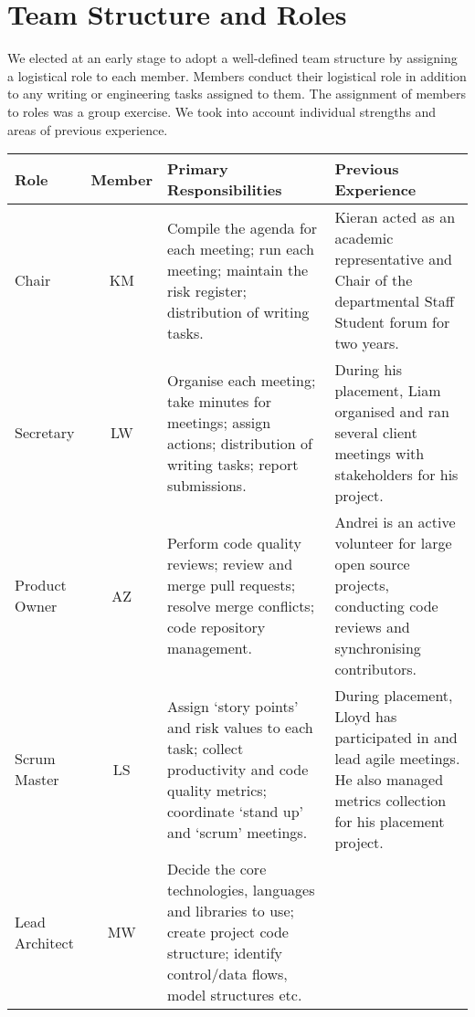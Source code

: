     \section{Team Structure and Roles}
    \label{team_structure}
    
    We elected at an early stage to adopt a well-defined team structure by assigning a logistical role to each member. Members conduct their logistical role in addition to any writing or engineering tasks assigned to them. The assignment of members to roles was a group exercise. We took into account individual strengths and areas of previous experience.

        \begin{table*}[h!]
        \begin{tabularx}{\textwidth}{|p{2cm}|c|Y|Y|}
        \hline
            \textbf{Role} & \textbf{Member} & \textbf{Primary Responsibilities} & \textbf{Previous Experience} \\
        \hline
        Chair & 
        KM & 
        Compile the agenda for each meeting; run each meeting; maintain the risk register; distribution of writing tasks. &
        Kieran acted as an academic representative and Chair of the departmental Staff Student forum for two years. \\
        \hline
        Secretary & 
        LW & 
        Organise each meeting; take minutes for meetings; assign actions; distribution of writing tasks; report submissions. & 
        During his placement, Liam organised and ran several client meetings with stakeholders for his project. \\
        \hline
        Product Owner & 
        AZ & 
        Perform code quality reviews; review and merge pull requests; resolve merge conflicts; code repository management. & 
        Andrei is an active volunteer for large open source projects, conducting code reviews and synchronising contributors. \\
        \hline
        Scrum Master & 
        LS & 
        Assign `story points' and risk values to each task; collect productivity and code quality metrics; coordinate `stand up' and `scrum' meetings. & 
        During placement, Lloyd has participated in and lead agile meetings. He also managed metrics collection for his placement project. \\
        \hline
        Lead Architect & 
        MW & 
        Decide the core technologies, languages and libraries to use; create project code structure; identify control/data flows, model structures etc. & 

\end{tabularx}
\end{table*}
